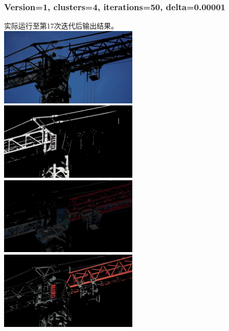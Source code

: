 \documentclass{article}
\begin{document}
\subsubsection{Version=1, clusters=4, iterations=50, delta=0.00001}
实际运行至第17次迭代后输出结果。\\
\includegraphics[width=0.5\textwidth]{src/i17d1e-5section1.png}
\includegraphics[width=0.5\textwidth]{src/i17d1e-5section2.png}\\
\includegraphics[width=0.5\textwidth]{src/i17d1e-5section3.png}
\includegraphics[width=0.5\textwidth]{src/i17d1e-5section4.png}\\
\end{document}
